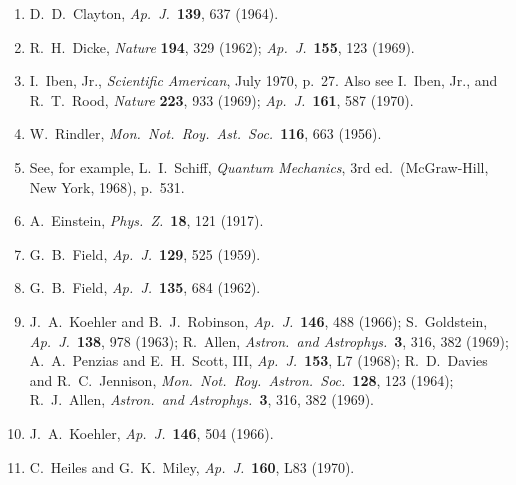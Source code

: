 \begin{enumerate}
  \item{}\label{ch15-ref-22}
  D.~D.~Clayton, \emph{Ap.\ J.}\ \textbf{139}, 637 (1964).

  \item{}\label{ch15-ref-23}
  R.~H.~Dicke, \emph{Nature} \textbf{194}, 329 (1962);
  \emph{Ap.\ J.}\ \textbf{155}, 123 (1969).

  \item{}\label{ch15-ref-24}
  I.~Iben, Jr., \emph{Scientific American}, July 1970, p.~27.
  Also see I.~Iben, Jr., and R.~T.~Rood,
  \emph{Nature} \textbf{223}, 933 (1969);
  \emph{Ap.\ J.}\ \textbf{161}, 587 (1970).

  \item{}\label{ch15-ref-25}
  W.~Rindler, \emph{Mon.\ Not.\ Roy.\ Ast.\ Soc.}\ \textbf{116},
  663 (1956).

  \item{}\label{ch15-ref-26}
  See, for example, L.~I.~Schiff, \emph{Quantum Mechanics}, 3rd ed.\
  (McGraw-Hill, New York, 1968), p.~531.

  \item{}\label{ch15-ref-27}
  A.~Einstein, \emph{Phys.\ Z.}\ \textbf{18}, 121 (1917).

  \item{}\label{ch15-ref-28}
  G.~B.~Field, \emph{Ap.\ J.}\ \textbf{129}, 525 (1959).

  \item{}\label{ch15-ref-29}
  G.~B.~Field, \emph{Ap.\ J.}\ \textbf{135}, 684 (1962).

  \item{}\label{ch15-ref-30}
  J.~A.~Koehler and B.~J.~Robinson,
  \emph{Ap.\ J.}\ \textbf{146}, 488 (1966);
  S.~Goldstein, \emph{Ap.\ J.}\ \textbf{138}, 978 (1963);
  R.~Allen, \emph{Astron.\ and Astrophys.}\ \textbf{3}, 316, 382 (1969);
  A.~A.~Penzias and E.~H.~Scott, III,
  \emph{Ap.\ J.}\ \textbf{153}, L7 (1968);
  R.~D.~Davies and R.~C.~Jennison,
  \emph{Mon.\ Not.\ Roy.\ Astron.\ Soc.}\ \textbf{128}, 123 (1964);
  R.~J.~Allen, \emph{Astron.\ and Astrophys.}\ \textbf{3}, 316, 382 (1969).

  \item{}\label{ch15-ref-31}
  J.~A.~Koehler, \emph{Ap.\ J.}\ \textbf{146}, 504 (1966).

  \item{}\label{ch15-ref-32}
  C.~Heiles and G.~K.~Miley, \emph{Ap.\ J.}\ \textbf{160}, L83 (1970).


\end{enumerate}
